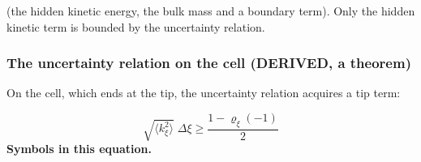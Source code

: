 \documentclass[
  10pt,
]{article}
\begin{document}
(the hidden kinetic energy, the bulk mass and a boundary term). Only the
hidden kinetic term is bounded by the uncertainty relation.

\hypertarget{the-uncertainty-relation-on-the-cell-derived-a-theorem}{%
\subsubsection*{The uncertainty relation on the cell (DERIVED, a
theorem)}\label{the-uncertainty-relation-on-the-cell-derived-a-theorem}}

On the cell, which ends at the tip, the uncertainty relation acquires a
tip term:

\[ \sqrt{\langle k_\xi^2\rangle}\;\Delta\xi \ge \frac{1 - \varrho_\xi(-1)}{2} \]
\textbf{Symbols in this equation.}
\end{document}
